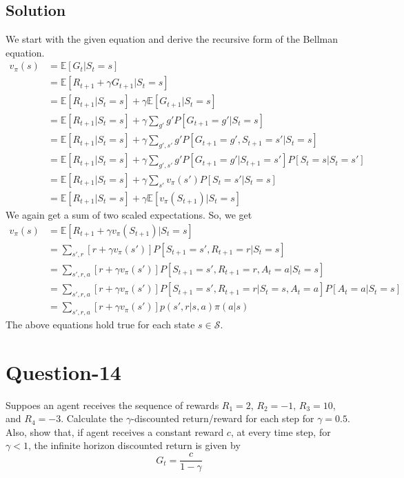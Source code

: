 \documentclass[11pt]{article}
\begin{document}
    \subsection*{Solution}
    We start with the given equation and derive the recursive form of the Bellman equation.
    \begin{align*}
        v_{\pi}(s) &= \mathbb{E}[G_{t} | S_{t} = s] \\
        &= \mathbb{E}[R_{t+1} + \gamma G_{t+1} | S_{t} = s] \\
        &= \mathbb{E}[R_{t+1} | S_{t} = s] + \gamma \mathbb{E}[G_{t+1} | S_{t} = s] \\
        &= \mathbb{E}[R_{t+1} | S_{t} = s] + \gamma \sum_{g'} g' P[G_{t+1} = g' | S_{t} = s] \\
        &= \mathbb{E}[R_{t+1} | S_{t} = s] + \gamma \sum_{g', s'} g' P[G_{t+1} = g', S_{t+1} = s' | S_{t} = s] \\
        &= \mathbb{E}[R_{t+1} | S_{t} = s] + \gamma \sum_{g', s'} g' P[G_{t+1} = g' | S_{t+1} = s'] P[S_{t} = s | S_{t} = s'] \\
        &= \mathbb{E}[R_{t+1} | S_{t} = s] + \gamma \sum_{s'} v_{\pi}(s') P[S_{t} = s' | S_{t} = s] \\
        &= \mathbb{E}[R_{t+1} | S_{t} = s] + \gamma \mathbb{E}[v_{\pi}(S_{t+1}) | S_{t} = s]
    \end{align*}
    We again get a sum of two scaled expectations. So, we get
    \begin{align*}
        v_{\pi}(s) &= \mathbb{E}[R_{t+1} + \gamma v_{\pi}(S_{t+1}) | S_{t} = s] \\
        &= \sum_{s', r} \left[ r + \gamma v_{\pi}(s') \right] P[S_{t+1} = s', R_{t+1} = r | S_{t} = s] \\
        &= \sum_{s', r, a} \left[ r + \gamma v_{\pi}(s') \right] P[S_{t+1} = s', R_{t+1} = r, A_{t} = a | S_{t} = s] \\
        &= \sum_{s', r, a} \left[ r + \gamma v_{\pi}(s') \right] P[S_{t+1} = s', R_{t+1} = r | S_{t} = s, A_{t} = a] P[A_{t} = a | S_{t} = s] \\
        &= \sum_{s', r, a} \left[ r + \gamma v_{\pi}(s') \right] p(s', r | s, a) \pi(a | s)
    \end{align*}
    The above equations hold true for each state $s \in \mathcal{S}$.

    \section*{Question-14}
    Suppoes an agent receives the sequence of rewards $R_{1} = 2$, $R_{2} = -1$, $R_{3} = 10$, and $R_{4} = -3$.
    Calculate the $\gamma$-discounted return/reward for each step for $\gamma = 0.5$. Also, show that, if agent
    receives a constant reward $c$, at every time step, for $\gamma < 1$, the infinite horizon discounted return
    is given by
    $$G_{t} = \frac{c}{1 - \gamma}$$
\end{document}
